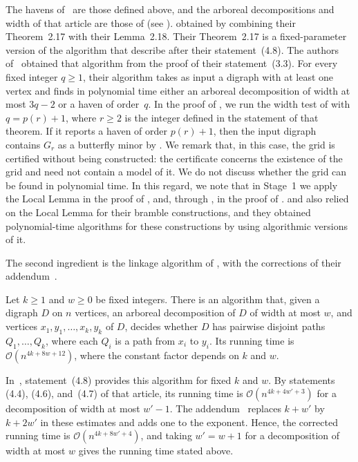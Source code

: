 \documentclass[fontsize=12pt,leading=14pt]{fullpaper}
\begin{document}
The havens of~\cite{CLMS22} are those defined above, and the arboreal decompositions and width of that article are those of  (see ).
\textcite{CLMS22} obtained  by combining their Theorem~2.17 with their Lemma~2.18.
Their Theorem~2.17 is a fixed-parameter version of the algorithm that \textcite{Johnson2001} describe after their statement~(4.8).
The authors of~\cite{Johnson2001} obtained that algorithm from the proof of their statement~(3.3).
For every fixed integer $q\ge1$, their algorithm takes as input a digraph with at least one vertex and finds in polynomial time either an arboreal decomposition of width at most $3q-2$ or a haven of order~$q$.
In the proof of , we run the width test of  with $q=p(r)+1$, where $r\ge2$ is the integer defined in the statement of that theorem.
If it reports a haven of order $p(r)+1$, then the input digraph contains $G_r$ as a butterfly minor by .
We remark that, in this case, the grid is certified without being constructed: the certificate concerns the existence of the grid and need not contain a model of it.
We do not discuss whether the grid can be found in polynomial time.
In this regard, we note that in Stage~1 we apply the Local Lemma in the proof of , and, through , in the proof of .
\textcite{LS26} and \textcite{CLNS26} also relied on the Local Lemma for their bramble constructions, and they obtained polynomial-time algorithms for these constructions by using algorithmic versions of it.

The second ingredient is the linkage algorithm of \textcite{Johnson2001}, with the corrections of their addendum~\cite{JRSTadd}.

\begin{proposition}\label{prop:jrst-linkage}
  Let $k\ge1$ and $w\ge0$ be fixed integers.
  There is an algorithm that, given a digraph $D$ on $n$ vertices, an arboreal decomposition of $D$ of width at most $w$, and vertices $x_1,y_1,\dots,x_k,y_k$ of $D$, decides whether $D$ has pairwise disjoint paths $Q_1,\dots,Q_k$, where each $Q_i$ is a path from $x_i$ to $y_i$.
  Its running time is $\mathcal{O}(n^{4k+8w+12})$, where the constant factor depends on $k$ and $w$.
\end{proposition}

In~\cite{Johnson2001}, statement~(4.8) provides this algorithm for fixed $k$ and $w$.
By statements (4.4), (4.6), and~(4.7) of that article, its running time is $\mathcal{O}(n^{4k+4w'+3})$ for a decomposition of width at most $w'-1$.
The addendum~\cite{JRSTadd} replaces $k+w'$ by $k+2w'$ in these estimates and adds one to the exponent.
Hence, the corrected running time is $\mathcal{O}(n^{4k+8w'+4})$, and taking $w'=w+1$ for a decomposition of width at most $w$ gives the running time stated above.
\end{document}
